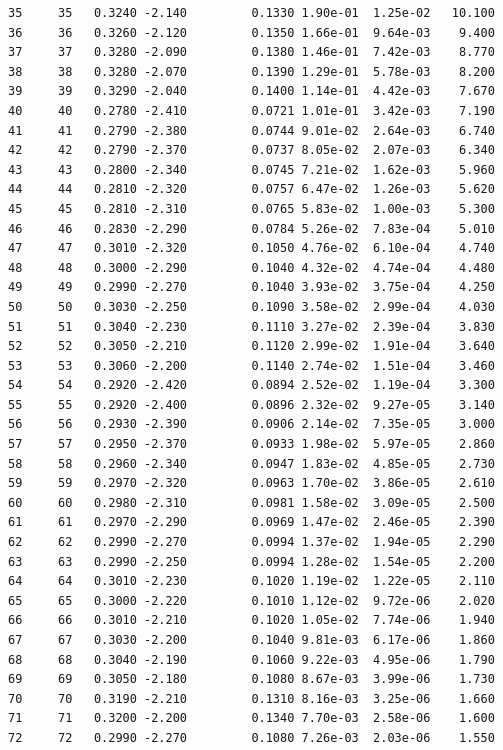 \documentclass[
  letterpaper,
  DIV=11,
  numbers=noendperiod]{scrartcl}
\begin{document}
\begin{verbatim}
35     35   0.3240 -2.140         0.1330 1.90e-01  1.25e-02   10.100
36     36   0.3260 -2.120         0.1350 1.66e-01  9.64e-03    9.400
37     37   0.3280 -2.090         0.1380 1.46e-01  7.42e-03    8.770
38     38   0.3280 -2.070         0.1390 1.29e-01  5.78e-03    8.200
39     39   0.3290 -2.040         0.1400 1.14e-01  4.42e-03    7.670
40     40   0.2780 -2.410         0.0721 1.01e-01  3.42e-03    7.190
41     41   0.2790 -2.380         0.0744 9.01e-02  2.64e-03    6.740
42     42   0.2790 -2.370         0.0737 8.05e-02  2.07e-03    6.340
43     43   0.2800 -2.340         0.0745 7.21e-02  1.62e-03    5.960
44     44   0.2810 -2.320         0.0757 6.47e-02  1.26e-03    5.620
45     45   0.2810 -2.310         0.0765 5.83e-02  1.00e-03    5.300
46     46   0.2830 -2.290         0.0784 5.26e-02  7.83e-04    5.010
47     47   0.3010 -2.320         0.1050 4.76e-02  6.10e-04    4.740
48     48   0.3000 -2.290         0.1040 4.32e-02  4.74e-04    4.480
49     49   0.2990 -2.270         0.1040 3.93e-02  3.75e-04    4.250
50     50   0.3030 -2.250         0.1090 3.58e-02  2.99e-04    4.030
51     51   0.3040 -2.230         0.1110 3.27e-02  2.39e-04    3.830
52     52   0.3050 -2.210         0.1120 2.99e-02  1.91e-04    3.640
53     53   0.3060 -2.200         0.1140 2.74e-02  1.51e-04    3.460
54     54   0.2920 -2.420         0.0894 2.52e-02  1.19e-04    3.300
55     55   0.2920 -2.400         0.0896 2.32e-02  9.27e-05    3.140
56     56   0.2930 -2.390         0.0906 2.14e-02  7.35e-05    3.000
57     57   0.2950 -2.370         0.0933 1.98e-02  5.97e-05    2.860
58     58   0.2960 -2.340         0.0947 1.83e-02  4.85e-05    2.730
59     59   0.2970 -2.320         0.0963 1.70e-02  3.86e-05    2.610
60     60   0.2980 -2.310         0.0981 1.58e-02  3.09e-05    2.500
61     61   0.2970 -2.290         0.0969 1.47e-02  2.46e-05    2.390
62     62   0.2990 -2.270         0.0994 1.37e-02  1.94e-05    2.290
63     63   0.2990 -2.250         0.0994 1.28e-02  1.54e-05    2.200
64     64   0.3010 -2.230         0.1020 1.19e-02  1.22e-05    2.110
65     65   0.3000 -2.220         0.1010 1.12e-02  9.72e-06    2.020
66     66   0.3010 -2.210         0.1020 1.05e-02  7.74e-06    1.940
67     67   0.3030 -2.200         0.1040 9.81e-03  6.17e-06    1.860
68     68   0.3040 -2.190         0.1060 9.22e-03  4.95e-06    1.790
69     69   0.3050 -2.180         0.1080 8.67e-03  3.99e-06    1.730
70     70   0.3190 -2.210         0.1310 8.16e-03  3.25e-06    1.660
71     71   0.3200 -2.200         0.1340 7.70e-03  2.58e-06    1.600
72     72   0.2990 -2.270         0.1080 7.26e-03  2.03e-06    1.550

\end{verbatim}
\end{document}
